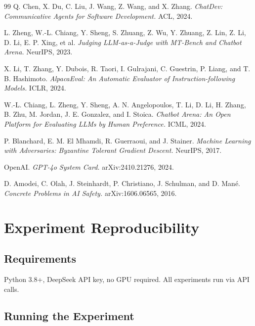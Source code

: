 \documentclass[11pt,a4paper]{article}
\begin{document}
\begin{thebibliography}{99}
Q. Chen, X. Du, C. Liu, J. Wang, Z. Wang, and X. Zhang.
\textit{ChatDev: Communicative Agents for Software Development.}
ACL, 2024.

L. Zheng, W.-L. Chiang, Y. Sheng, S. Zhuang, Z. Wu, Y. Zhuang, Z. Lin, Z. Li, D. Li, E. P. Xing, et al.
\textit{Judging LLM-as-a-Judge with MT-Bench and Chatbot Arena.}
NeurIPS, 2023.

X. Li, T. Zhang, Y. Dubois, R. Taori, I. Gulrajani, C. Guestrin, P. Liang, and T. B. Hashimoto.
\textit{AlpacaEval: An Automatic Evaluator of Instruction-following Models.}
ICLR, 2024.

W.-L. Chiang, L. Zheng, Y. Sheng, A. N. Angelopoulos, T. Li, D. Li, H. Zhang, B. Zhu, M. Jordan, J. E. Gonzalez, and I. Stoica.
\textit{Chatbot Arena: An Open Platform for Evaluating LLMs by Human Preference.}
ICML, 2024.

P. Blanchard, E. M. El Mhamdi, R. Guerraoui, and J. Stainer.
\textit{Machine Learning with Adversaries: Byzantine Tolerant Gradient Descent.}
NeurIPS, 2017.

OpenAI.
\textit{GPT-4o System Card.}
arXiv:2410.21276, 2024.

D. Amodei, C. Olah, J. Steinhardt, P. Christiano, J. Schulman, and D. Man\'e.
\textit{Concrete Problems in AI Safety.}
arXiv:1606.06565, 2016.

\end{thebibliography}

\appendix
\section{Experiment Reproducibility}

\subsection{Requirements}

Python 3.8+, DeepSeek API key, no GPU required. All experiments run via API calls.

\subsection{Running the Experiment}
\end{document}
